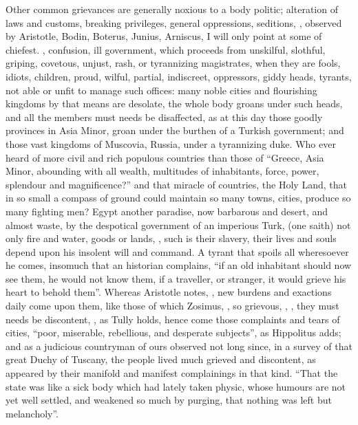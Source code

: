 Other common grievances are generally noxious to a body politic; alteration of
laws and customs, breaking privileges, general oppressions, seditions, \etc{},
observed by Aristotle, Bodin, Boterus, Junius, Arniscus,
\etc{} I will only point at some of chiefest.
, confusion, ill
government, which proceeds from unskilful, slothful, griping, covetous, unjust,
rash, or tyrannizing magistrates, when they are fools, idiots, children, proud,
wilful, partial, indiscreet, oppressors, giddy heads, tyrants, not able or
unfit to manage such offices: many noble cities and
flourishing kingdoms by that means are desolate, the whole body groans under
such heads, and all the members must needs be disaffected, as at this day those
goodly provinces in Asia Minor, \etc{} groan under the burthen of a Turkish
government; and those vast kingdoms of Muscovia, Russia,
under a tyrannizing duke. Who ever heard of more civil and
rich populous countries than those of \enquote{Greece, Asia Minor, abounding with all
wealth, multitudes of inhabitants, force, power, splendour
and magnificence?} and that miracle of countries, the Holy
Land, that in so small a compass of ground could maintain so many towns,
cities, produce so many fighting men? Egypt another paradise, now barbarous and
desert, and almost waste, by the despotical government of an imperious Turk,
 (one saith) not
only fire and water, goods or lands, , such is their slavery, their lives and souls depend upon
his insolent will and command. A tyrant that spoils all wheresoever he comes,
insomuch that an historian complains, \enquote{if an old inhabitant
should now see them, he would not know them, if a traveller, or stranger, it
would grieve his heart to behold them}. Whereas Aristotle
notes, , new burdens and exactions
daily come upon them, like those of which Zosimus, , so grievous, , \etc{}, they must needs be discontent, , as Tully holds, hence come
those complaints and tears of cities, \enquote{poor, miserable, rebellious, and
desperate subjects}, as Hippolitus adds; and
as a judicious countryman of ours observed not long since,
in a survey of that great Duchy of Tuscany, the people lived much grieved and
discontent, as appeared by their manifold and manifest complainings in that
kind. \enquote{That the state was like a sick body which had lately taken physic, whose
humours are not yet well settled, and weakened so much by purging, that nothing
was left but melancholy}.

